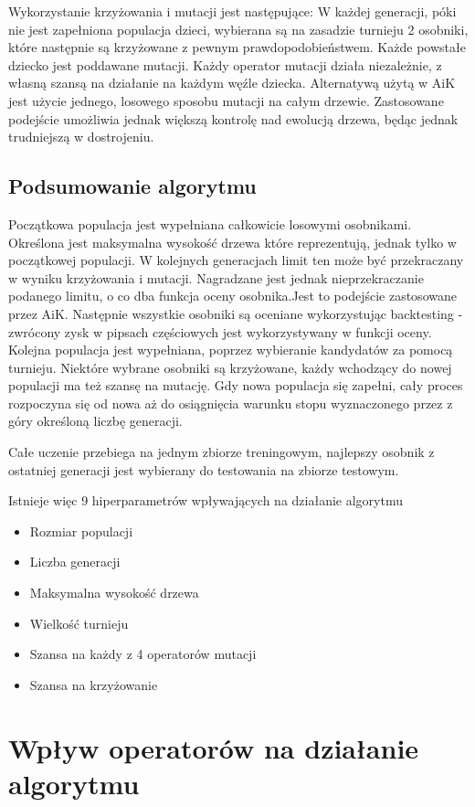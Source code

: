 \documentclass[twoside]{iisthesis}
\begin{document}
Wykorzystanie krzyżowania i mutacji jest następujące: W każdej generacji, póki nie jest zapełniona populacja dzieci, wybierana są na zasadzie turnieju 2 osobniki, które następnie są krzyżowane z pewnym prawdopodobieństwem. Każde powstałe  dziecko jest poddawane mutacji. Każdy operator mutacji działa niezależnie, z własną szansą na działanie na każdym węźle dziecka. Alternatywą użytą w AiK jest użycie jednego, losowego sposobu mutacji na całym drzewie. Zastosowane podejście umożliwia jednak większą kontrolę nad ewolucją drzewa, będąc jednak trudniejszą w dostrojeniu.

\section {Podsumowanie algorytmu}

Początkowa populacja jest wypełniana całkowicie losowymi osobnikami. Określona jest maksymalna wysokość drzewa które reprezentują, jednak tylko w początkowej populacji. W kolejnych generacjach limit ten może być przekraczany w wyniku krzyżowania i mutacji. Nagradzane jest jednak nieprzekraczanie podanego limitu, o co dba funkcja oceny osobnika.Jest to podejście zastosowane przez AiK. Następnie wszystkie osobniki są oceniane wykorzystując backtesting - zwrócony zysk w pipsach częściowych jest wykorzystywany w funkcji oceny. Kolejna populacja jest wypełniana, poprzez wybieranie kandydatów za pomocą turnieju. Niektóre wybrane osobniki są krzyżowane, każdy wchodzący do nowej populacji ma też szansę na mutację. Gdy nowa populacja się zapełni, cały proces rozpoczyna się od nowa aż do osiągnięcia warunku stopu wyznaczonego przez z góry określoną liczbę generacji.

Całe uczenie przebiega na jednym zbiorze treningowym, najlepszy osobnik z ostatniej generacji jest wybierany do testowania na zbiorze testowym. 

Istnieje więc 9 hiperparametrów wpływających na działanie algorytmu
\begin{itemize}
\item Rozmiar populacji
\item Liczba generacji
\item Maksymalna wysokość drzewa
\item Wielkość turnieju
\item Szansa na każdy z 4 operatorów mutacji
\item Szansa na krzyżowanie
\end{itemize}

\chapter {Wpływ operatorów na działanie algorytmu}
\end{document}
